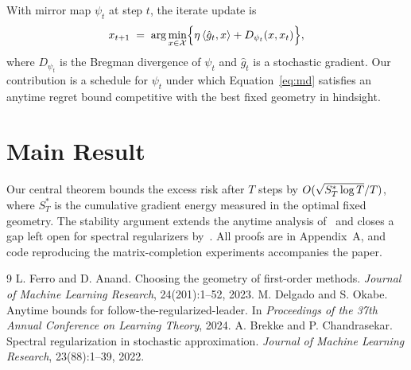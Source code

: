 \documentclass[11pt]{article}
\begin{document}
With mirror map $\psi_t$ at step $t$, the iterate update is
\begin{equation}
  x_{t+1} \;=\; \arg\min_{x \in \mathcal{X}}
  \Bigl\{ \eta \,\langle \hat{g}_t, x \rangle + D_{\psi_t}(x, x_t) \Bigr\},
  \label{eq:md}
\end{equation}
where $D_{\psi_t}$ is the Bregman divergence of $\psi_t$ and $\hat{g}_t$ is
a stochastic gradient. Our contribution is a schedule for $\psi_t$ under
which Equation~\eqref{eq:md} satisfies an anytime regret bound competitive
with the best fixed geometry in hindsight.

\section{Main Result}
Our central theorem bounds the excess risk after $T$ steps by
$O(\sqrt{\smash[b]{S_T^{\ast} \log T}}/T)$, where $S_T^{\ast}$ is the
cumulative gradient energy measured in the optimal fixed geometry. The
stability argument extends the anytime analysis of~\cite{delgado2024anytime}
and closes a gap left open for spectral regularizers
by~\cite{brekke2022spectral}. All proofs are in Appendix~A, and code
reproducing the matrix-completion experiments accompanies the paper.

\begin{thebibliography}{9}
 L. Ferro and D. Anand.
Choosing the geometry of first-order methods.
\textit{Journal of Machine Learning Research}, 24(201):1--52, 2023.
 M. Delgado and S. Okabe.
Anytime bounds for follow-the-regularized-leader.
In \textit{Proceedings of the 37th Annual Conference on Learning Theory}, 2024.
 A. Brekke and P. Chandrasekar.
Spectral regularization in stochastic approximation.
\textit{Journal of Machine Learning Research}, 23(88):1--39, 2022.
\end{thebibliography}
\end{document}
